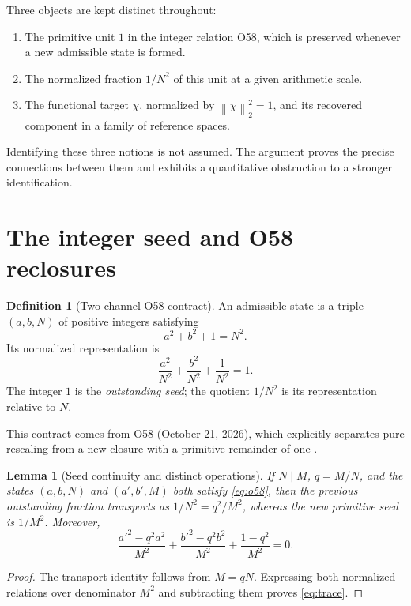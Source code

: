 \documentclass[11pt,a4paper]{article}
\theoremstyle{mine}
\newtheorem{lemma}[theorem]{Lemma}
\theoremstyle{definition}
\newtheorem{definition}[theorem]{Definition}
\newcommand{\norm}[1]{\left\lVert#1\right\rVert}
\begin{document}
Three objects are kept distinct throughout:
\begin{enumerate}
\item The primitive unit $1$ in the integer relation O58, which is preserved whenever a new admissible state is formed.
\item The normalized fraction $1/N^2$ of this unit at a given arithmetic scale.
\item The functional target $\chi$, normalized by $\norm\chi_2^2=1$, and its recovered component in a family of reference spaces.
\end{enumerate}

Identifying these three notions is not assumed. The argument proves the precise connections between them and exhibits a quantitative obstruction to a stronger identification.

\section{The integer seed and O58 reclosures}

\begin{definition}[Two-channel O58 contract]
An admissible state is a triple $(a,b,N)$ of positive integers satisfying
\begin{equation}\label{eq:o58}
 a^2+b^2+1=N^2.
\end{equation}
Its normalized representation is
\begin{equation}\label{eq:o58norm}
\frac{a^2}{N^2}+\frac{b^2}{N^2}+\frac1{N^2}=1.
\end{equation}
The integer $1$ is the \emph{outstanding seed}; the quotient $1/N^2$ is its representation relative to $N$.
\end{definition}

This contract comes from O58 (October 21, 2026), which explicitly separates pure rescaling from a new closure with a primitive remainder of one \cite{O58}.

\begin{lemma}[Seed continuity and distinct operations]\label{le:transport}
If $N\mid M$, $q=M/N$, and the states $(a,b,N)$ and $(a',b',M)$ both satisfy \eqref{eq:o58}, then the previous outstanding fraction transports as $1/N^2=q^2/M^2$, whereas the new primitive seed is $1/M^2$. Moreover,
\begin{equation}\label{eq:trace}
\frac{a'^2-q^2a^2}{M^2}+\frac{b'^2-q^2b^2}{M^2}+\frac{1-q^2}{M^2}=0.
\end{equation}
\end{lemma}
\begin{proof}
The transport identity follows from $M=qN$. Expressing both normalized relations over denominator $M^2$ and subtracting them proves \eqref{eq:trace}.
\end{proof}
\end{document}
